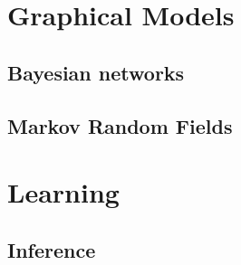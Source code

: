 \documentclass[twoside,openright,titlepage,numbers=noenddot,openany,headinclude,footinclude=true,
  cleardoublepage=empty,abstractoff,BCOR=5mm,paper=a4,fontsize=12pt]{scrreprt}
\begin{document}
\part{Graphical Models}

\chapter{Bayesian networks}



\chapter{Markov Random Fields}




\ctparttext{
  \color{black}
  \begin{center}

  \end{center}
}
\part{Learning}

\chapter{Inference}



\clearpage
\nocite{*}


\end{document}
